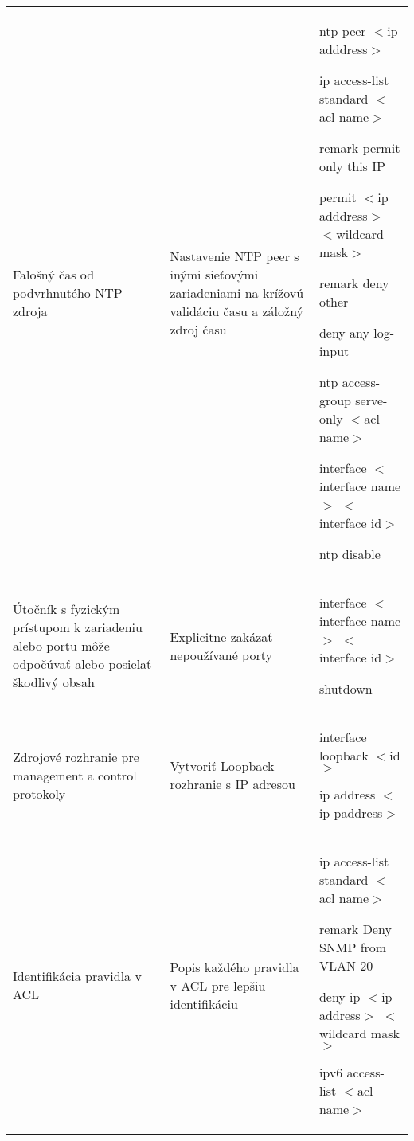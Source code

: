 \begin{longtable}[!htbp]{|L{10em}L{10em}L{34em}|}
	
	
	Falošný čas od podvrhnutého NTP zdroja	&Nastavenie NTP peer s inými sieťovými zariadeniami na krížovú validáciu času a záložný zdroj času	&ntp peer $<$ip adddress$>$
	
	ip access-list standard $<$acl name$>$
	
	\hspace{0.5em}remark permit only this IP 

	\hspace{0.5em}permit $<$ip adddress$>$ $<$wildcard mask$>$
	
	\hspace{0.5em}remark deny other 

	\hspace{0.5em}deny any log-input
	
	ntp access-group serve-only $<$acl name$>$
	
	interface $<$interface name$>$ $<$interface id$>$
	
	\hspace{0.5em}ntp disable\\
	
	
	
	
	 Útočník s fyzickým prístupom k zariadeniu alebo portu môže odpočúvať alebo posielať škodlivý obsah	&Explicitne zakázať nepoužívané porty	&interface $<$interface name$>$ $<$interface id$>$
	
	\hspace{0.5em}shutdown\\
	
	
	
	
	Zdrojové rozhranie pre management a control protokoly	&Vytvoriť Loopback rozhranie s IP adresou	&interface loopback $<$id$>$
	
	\hspace{0.5em}ip address $<$ip paddress$>$\\
	
	
	
	
	 Identifikácia pravidla v ACL	&Popis každého pravidla v ACL pre lepšiu identifikáciu	&ip access-list standard $<$acl name$>$
	
	\hspace{0.5em}remark Deny SNMP from VLAN 20
	
	\hspace{0.5em}deny ip $<$ip address$>$ $<$wildcard mask$>$
	\vspace{0.5em}
	
	ipv6 access-list $<$acl name$>$


\end{longtable}
